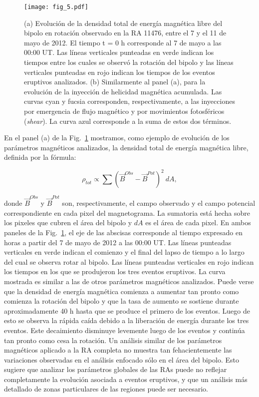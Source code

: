 \documentclass[baaa]{baaa}
\begin{document}
\begin{figure}[!t]
\centering
\texttt{[image: fig\_5.pdf]}
\caption{(a) Evolución de la densidad total de energía magnética libre del bipolo en rotación observado en la RA 11476, entre el 7 y el 11 de mayo de 2012. El tiempo t = 0 h corresponde al 7 de mayo a las 00:00 UT. Las líneas verticales punteadas en verde indican los tiempos entre los cuales se observó la rotación del bipolo y las líneas verticales punteadas en rojo indican los tiempos de los eventos eruptivos analizados. (b) Similarmente al panel (a), para la evolución de la inyección de helicidad magnética acumulada. Las curvas cyan y fucsia corresponden, respectivamente, a las inyecciones por emergencia de flujo magnético y por movimientos fotosféricos ({\sl shear}). La curva azul corresponde a la suma de estos dos términos.}
\label{fig_5}
\end{figure}

En el panel (a) de la Fig.~\ref{fig_5} mostramos, como ejemplo de evolución de los parámetros magnéticos analizados, la densidad total de energía magnética libre, definida por la fórmula:

\begin{equation}
\rho_{tot} \propto \sum \left(\vec{B} ^{Obs}-\vec{B} ^{Pot}\right)^{2}~dA,
\end{equation}

\noindent donde $\vec{B}^{Obs}$ y $\vec{B}^{Pot}$ son, respectivamente, el campo observado y el campo potencial correspondiente en cada pixel del magnetograma. La sumatoria está hecha sobre los pixeles que cubren el área del bipolo y $dA$ es el área de cada pixel. En ambos paneles de la Fig.~\ref{fig_5}, el eje de las abscisas corresponde al tiempo expresado en horas a partir del 7 de mayo de 2012 a las 00:00 UT. Las líneas punteadas verticales en verde indican el comienzo y el final del lapso de tiempo a lo largo del cual se observa rotar al bipolo. Las líneas punteadas verticales en rojo indican los tiempos en los que se produjeron los tres eventos eruptivos. La curva mostrada es similar a las de otros parámetros magnéticos analizados. Puede verse que la densidad de energía magnética comienza a aumentar tan pronto como comienza la rotación del bipolo y que la tasa de aumento se sostiene durante aproximadamente 40 h hasta que se produce el primero de los eventos. Luego de esto se observa la rápida caída debido a la liberación de energía durante los tres eventos. Este decaimiento disminuye levemente luego de los eventos y continúa tan pronto como cesa la rotación. Un análisis similar de los parámetros magnéticos aplicado a la RA completa no muestra tan fehacientemente las variaciones observadas en el análisis enfocado sólo en el área del bipolo. Esto sugiere que analizar los parámetros globales de las RAs puede no reflejar completamente la evolución asociada a eventos eruptivos, y que un análisis más detallado de zonas particulares de las regiones puede ser necesario.
\end{document}
